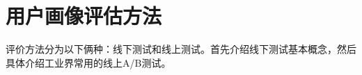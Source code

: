         \begin{figure}
        \centering
          \label{pic:hl_usergroup}
        \end{figure}

    \section{用户画像评估方法}
    评价方法分为以下俩种：线下测试和线上测试。首先介绍线下测试基本概念，然后具体介绍工业界常用的线上A/B测试。
